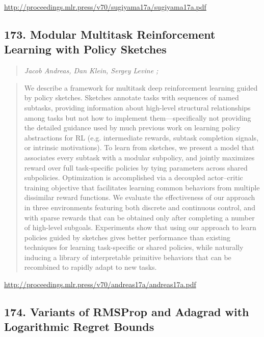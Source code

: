 \documentclass{article}
\begin{document}
\href{http://proceedings.mlr.press/v70/sugiyama17a/sugiyama17a.pdf}{http://proceedings.mlr.press/v70/sugiyama17a/sugiyama17a.pdf}

\subsection{173. Modular Multitask Reinforcement Learning with Policy Sketches}

\begin{quote}
\footnotesize{\textit{Jacob Andreas, Dan Klein, Sergey Levine ;}}

\end{quote}

\begin{quote}
    We describe a framework for multitask deep reinforcement learning guided by policy sketches. Sketches annotate tasks with sequences of named subtasks, providing information about high-level structural relationships among tasks but not how to implement them—specifically not providing the detailed guidance used by much previous work on learning policy abstractions for RL (e.g. intermediate rewards, subtask completion signals, or intrinsic motivations). To learn from sketches, we present a model that associates every subtask with a modular subpolicy, and jointly maximizes reward over full task-specific policies by tying parameters across shared subpolicies. Optimization is accomplished via a decoupled actor–critic training objective that facilitates learning common behaviors from multiple dissimilar reward functions. We evaluate the effectiveness of our approach in three environments featuring both discrete and continuous control, and with sparse rewards that can be obtained only after completing a number of high-level subgoals. Experiments show that using our approach to learn policies guided by sketches gives better performance than existing techniques for learning task-specific or shared policies, while naturally inducing a library of interpretable primitive behaviors that can be recombined to rapidly adapt to new tasks.  
\end{quote}

\href{http://proceedings.mlr.press/v70/andreas17a/andreas17a.pdf}{http://proceedings.mlr.press/v70/andreas17a/andreas17a.pdf}

\subsection{174. Variants of RMSProp and Adagrad with Logarithmic Regret Bounds}
\end{document}
